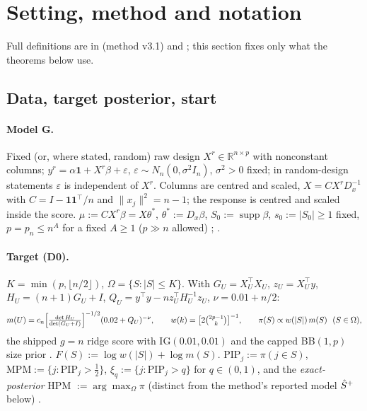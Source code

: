\section{Setting, method and notation}\label{sec:setting}

Full definitions are in  (method v3.1) and ; this section fixes only what the theorems below use.

\subsection{Data, target posterior, start}
\paragraph{Model G.} Fixed (or, where stated, random) raw design $X^r\in\mathbb R^{n\times p}$ with nonconstant columns; $y^r=\alpha\mathbf 1+X^r\beta+\varepsilon$, $\varepsilon\sim N_n(0,\sigma^2I_n)$, $\sigma^2>0$ fixed; in random-design statements $\varepsilon$ is independent of $X^r$. Columns are centred and scaled, $X=CX^rD_x^{-1}$ with $C=I-\mathbf 1\mathbf 1^\top/n$ and $\|x_j\|^2=n-1$; the response is centred and scaled inside the score. $\mu:=CX^r\beta=X\theta^*$, $\theta^*:=D_x\beta$, $S_0:=\operatorname{supp}\beta$, $s_0:=|S_0|\ge1$ fixed, $p=p_n\le n^A$ for a fixed $A\ge1$ ($p\gg n$ allowed) ; .

\paragraph{Target (D0).} $K=\min(p,\lfloor n/2\rfloor)$, $\Omega=\{S:|S|\le K\}$. With $G_U=X_U^\top X_U$, $z_U=X_U^\top y$, $H_U=(n+1)G_U+I$, $Q_U=y^\top y-nz_U^\top H_U^{-1}z_U$, $\nu=0.01+n/2$:
\[
m(U)=c_n\Bigl[\tfrac{\det H_U}{\det(G_U+I)}\Bigr]^{-1/2}(0.02+Q_U)^{-\nu},\qquad w(k)=\bigl[2\tbinom{2p-1}{k}\bigr]^{-1},\qquad \pi(S)\propto w(|S|)\,m(S)\ \ (S\in\Omega),
\]
the shipped $g=n$ ridge score with IG$(0.01,0.01)$ and the capped BB$(1,p)$ size prior . $F(S):=\log w(|S|)+\log m(S)$. $\mathrm{PIP}_j:=\pi(j\in S)$, $\mathrm{MPM}:=\{j:\mathrm{PIP}_j>\tfrac12\}$, $\xi_q:=\{j:\mathrm{PIP}_j>q\}$ for $q\in(0,1)$, and the \emph{exact-posterior} HPM $:=\arg\max_\Omega\pi$ (distinct from the method's reported model $\hat S^{+}$ below) .

